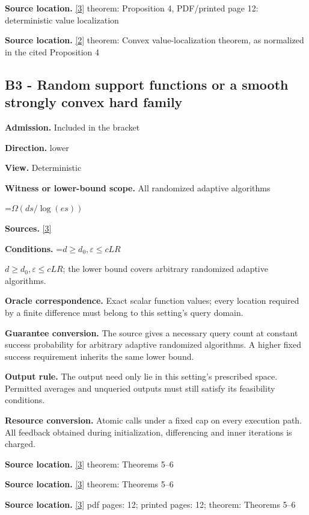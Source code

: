\documentclass[10pt,a4paper]{article}
\newcommand{\AtlasMath}[1]{\par\begingroup\centering\setbox0=\hbox{$\displaystyle #1$}\ifdim\wd0>1.4\linewidth\typeout{ATLAS WIDE FORMULA: \the\wd0}\fi\ifdim\wd0>\linewidth\resizebox{\linewidth}{!}{\box0}\else\box0\fi\par\endgroup}
\newcommand{\AtlasInlineMath}[1]{\begingroup\setbox0=\hbox{$#1$}\ifdim\wd0>.4\linewidth\endgroup\AtlasMath{#1}\else\endgroup$#1$\fi}
\begin{document}
\textbf{Source location.} \href{https://arxiv.org/html/2607.16558v2}{[3]} theorem: Proposition 4, PDF/printed page 12: deterministic value localization

\textbf{Source location.} \href{https://www.mathnet.ru/php/archive.phtml?jrnid=mzm&option_lang=eng&paperid=1697&wshow=paper}{[2]} theorem: Convex value-localization theorem, as normalized in the cited Proposition 4

\subsection{B3 - Random support functions or a smooth strongly convex hard family}
\textbf{Admission.} Included in the bracket

\textbf{Direction.} lower

\textbf{View.} Deterministic

\textbf{Witness or lower-bound scope.} All randomized adaptive algorithms

\AtlasMath{\Omega(ds/\log(es))}
\textbf{Sources.} \href{https://arxiv.org/html/2607.16558v2}{[3]}

\textbf{Conditions.} \AtlasInlineMath{d\ge d_0,\varepsilon\le cLR}; the lower bound covers arbitrary randomized adaptive algorithms.

\textbf{Oracle correspondence.} Exact scalar function values; every location required by a finite difference must belong to this setting's query domain.

\textbf{Guarantee conversion.} The source gives a necessary query count at constant success probability for arbitrary adaptive randomized algorithms. A higher fixed success requirement inherits the same lower bound.

\textbf{Output rule.} The output need only lie in this setting's prescribed space. Permitted averages and unqueried outputs must still satisfy its feasibility conditions.

\textbf{Resource conversion.} Atomic calls under a fixed cap on every execution path. All feedback obtained during initialization, differencing and inner iterations is charged.

\textbf{Source location.} \href{https://arxiv.org/html/2607.16558v2}{[3]} theorem: Theorems 5--6

\textbf{Source location.} \href{https://arxiv.org/html/2607.16558v2}{[3]} theorem: Theorems 5--6

\textbf{Source location.} \href{https://arxiv.org/html/2607.16558v2}{[3]} pdf pages: 12; printed pages: 12; theorem: Theorems 5--6
\end{document}
